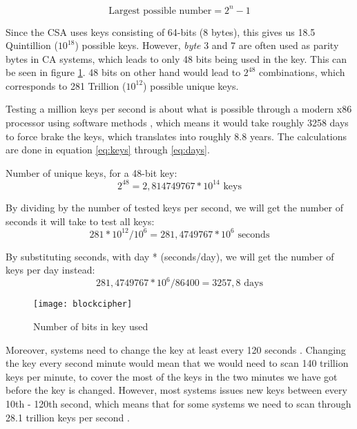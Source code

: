 \begin{equation} 
  \text{Largest possible number} = 2^{n} - 1
  \label{eq:num}
\end{equation}

Since the CSA uses keys consisting of 64-bits (8 bytes), this gives us 
18.5 Quintillion ($10^{18}$) possible keys. However, \emph{byte} 3 and 
7 are often used as parity bytes in CA systems, which leads to only 48 
bits being used in the key.  This can be seen in figure 
\ref{fig:blockcipher}. 48 bits on other hand would lead to $2^{48}$ 
combinations, which corresponds to 281 Trillion ($10^{12}$) possible 
unique keys. 

Testing a million keys per second is about what is possible through a 
modern x86 processor using software methods 
, which means it would take 
roughly 3258 days to force brake the keys, which translates into 
roughly 8.8 years. The calculations are done in equation \ref{eq:keys} 
through \ref{eq:days}. \citep{Breaking:2012}

Number of unique keys, for a 48-bit key:
\begin{equation}
  2^{48} = 2,814749767*10^{14} \text{ keys}
  \label{eq:keys}
\end{equation}

By dividing by the number of tested keys per second, we will get the 
number of seconds it will take to test all keys:
\begin{equation}
  281*10^{12} / 10^{6} = 281,4749767*10^{6} \text{ seconds}
  \label{eq:seconds}
\end{equation}

By substituting seconds, with day * (seconds/day), we will get the 
number of keys per day instead:
\begin{equation}
  281,4749767*10^{6} / 86400 = 3257,8 \text{ days}
  \label{eq:days}
\end{equation}

\begin{figure}[h!]
  \begin{center}
    \texttt{[image: blockcipher]}
  \end{center}
  \caption{Number of bits in key used}
  \label{fig:blockcipher}
\end{figure}

Moreover, systems need to change the key at least every 120 seconds 
\citep{Simpson:2009}. Changing the key every second minute would mean 
that we would need to scan 140 trillion keys per minute, to cover the 
most of the keys in the two minutes we have got before the key is 
changed. However, most systems issues new keys between every 10th - 
120th second, which means that for some systems we need to scan through 
28.1 trillion keys per second \citep{Wirt:2004}.

